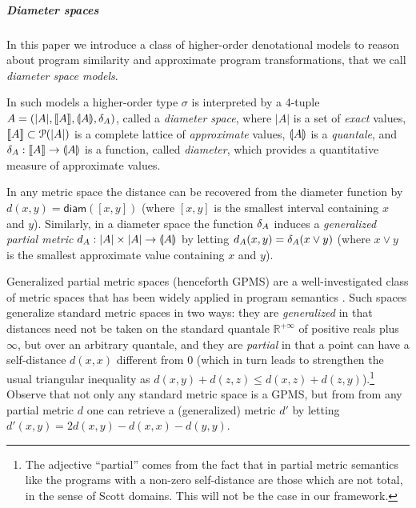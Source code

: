 





\subparagraph*{Diameter spaces}



In this paper we introduce a class of higher-order denotational models to reason about program similarity and approximate program transformations, that we call \emph{diameter space models}.

In such models a higher-order type $\sigma$ is interpreted by a 4-tuple $A=(|A|, \llbracket A \rrbracket, \llparenthesis A \rrparenthesis, \delta_{A})$, called a \emph{diameter space}, where $|A|$ is a set of \emph{exact} values, $\llbracket A \rrbracket\subset \mathcal P(|A|)$ is a complete lattice of \emph{approximate} values, $\llparenthesis A \rrparenthesis$ is a \emph{quantale}, and $\delta_{A}: \llbracket A \rrbracket\to \llparenthesis A \rrparenthesis$ is a function, called \emph{diameter}, which provides a quantitative measure of approximate values.


In any metric space the distance can be recovered from the diameter function by $d(x,y)=\mathsf{diam}([x,y])$ (where $[x,y]$ is the smallest interval containing $x$ and $y$). Similarly, in a diameter space the function $\delta_{A}$ induces a \emph{generalized partial metric} $d_{A}:|A|\times |A|\to \llparenthesis A \rrparenthesis$ by letting $d_{A}(x,y)=\delta_{A}(x\vee y)$ (where $x\vee y$ is the smallest approximate value containing $x$ and $y$). 


Generalized partial metric spaces (henceforth GPMS) are a well-investigated class of metric spaces that has been widely applied in program semantics \cite{}. 
Such spaces generalize standard metric spaces in two ways: they are \emph{generalized} in that distances need not be taken on the standard quantale $\mathbb R^{+\infty}$ of positive reals plus $\infty$, but over an arbitrary quantale, and they are \emph{partial} in that a point can have a self-distance $d(x,x)$ different from 0 (which in turn leads to strengthen the usual triangular inequality as $d(x,y) + d(z,z)\leq d(x,z)+d(z,y)$).\footnote{The adjective ``partial'' comes from the fact that in partial metric semantics like \cite{} the  programs with a non-zero self-distance are those which are not total, in the sense of Scott domains. This will not be the case in our framework. 
}   
Observe that not only any standard metric space is a GPMS, but from from any partial metric $d$ one can retrieve a (generalized) metric $d'$ by letting $d'(x,y)=2d(x,y)-d(x,x)-d(y,y)$.

